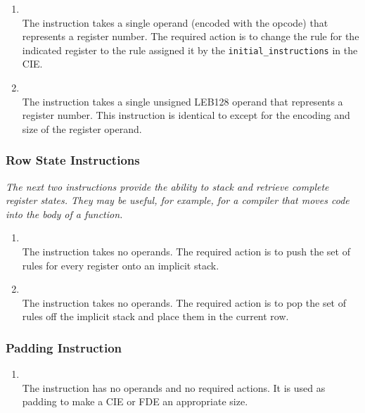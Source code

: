 \begin{enumerate}[1. ]
\item \textbf{\DWCFArestoreTARG} \\
The \DWCFArestoreNAME{} instruction takes a single operand (encoded
with the opcode) that represents a register number. The
required action is to change the rule for the indicated
register to the rule assigned it by the \texttt{initial\_instructions}
in the CIE.

\item \textbf{\DWCFArestoreextendedTARG} \\
The \DWCFArestoreextendedNAME{}
instruction takes a single unsigned LEB128 
operand that represents a register number. This
instruction is identical to \DWCFArestore{} except for the
encoding and size of the register operand.

\end{enumerate}

\subsubsection{Row State Instructions}
\label{chap:rowstateinstructions}

\textit{The next two instructions provide the ability to stack and
retrieve complete register states. They may be useful, for
example, for a compiler that moves  code 
into the
body of a function.}


\begin{enumerate}[1. ]

\item \textbf{\DWCFArememberstateTARG} \\
The \DWCFArememberstateNAME{} instruction takes no operands. The
required action is to push the set of rules for every register
onto an implicit stack.

\item \textbf{\DWCFArestorestateTARG} \\
The \DWCFArestorestateNAME{} instruction takes no operands. The
required action is to pop the set of rules off the implicit
stack and place them in the current row.

\end{enumerate}

\subsubsection{Padding Instruction}
\label{chap:paddinginstruction}
\begin{enumerate}[1. ]
\item \textbf{\DWCFAnopTARG} \\
The \DWCFAnopNAME{} instruction has no operands and no required
actions. It is used as padding to make a CIE or FDE an
appropriate size.

\end{enumerate}

